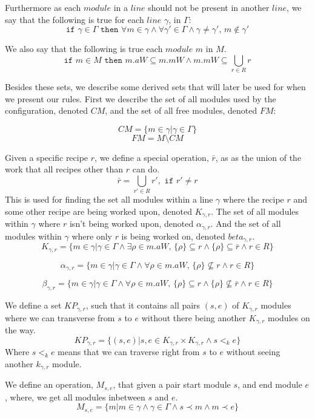 Furthermore as each $module$ in a $line$ should not be present in another $line$, we say that the following is true for each $line$ $\gamma$, in $\Gamma$:
\[\texttt{if } \gamma \in \Gamma \texttt{ then } \forall m \in \gamma \land \forall \gamma ' \in \Gamma \land \gamma \neq \gamma ',\, m \notin \gamma ' \]

We also say that the following is true each $module$ $m$ in $M$.
\[\texttt{if } m \in M \texttt{ then } m.aW \subseteq m.mW \land m.mW \subseteq  \bigcup_{r\in R}r\] 


Besides these sets, we describe some derived sets that will later be used for when we present our rules. First we describe the set of all modules used by the configuration, denoted $CM$, and the set of all free modules, denoted $FM$:


\[CM = \{m \in \gamma | \gamma \in \Gamma \}\]
\[FM = M \setminus CM \]

Given a specific recipe $r$, we define a special operation, $\bar{r}$, as as the union of the work that all recipes other than $r$ can do. 
\[\bar{r} = \bigcup_{r' \in R}r', \texttt{ if } r' \neq r\]
This is used for finding the set all modules within a line $\gamma$ where the recipe $r$ and some other recipe are being worked upon, denoted $K_{\gamma ,r}$. The set of all modules within $\gamma$ where $r$ isn't being worked upon, denoted $\alpha_{\gamma ,r}$. And the set of all modules within $\gamma$ where only $r$ is being worked on, denoted $beta_{\gamma ,r}$. 
\[K_{\gamma ,r} = \{m \in \gamma | \gamma \in \Gamma \land \exists \rho \in m.aW,\, \{\rho\} \subseteq r \land \{\rho\} \subseteq \bar{r} \land r \in R\}\]

\[\alpha_{\gamma ,r}  = \{m \in \gamma | \gamma \in \Gamma \land \forall \rho \in m.aW,\, \{\rho\} \nsubseteq r \land r \in R\}\]

\[\beta_{\gamma ,r}  = \{m \in \gamma | \gamma \in \Gamma \land \forall \rho \in m.aW,\, \{\rho\} \subseteq r \land \{\rho\} \nsubseteq \bar{r} \land r \in R\}\]


We define a set $KP_{\gamma ,r}$, such that it contains all pairs $(s, e)$ of $K_{\gamma ,r}$ modules where we can transverse from $s$ to $e$ without there being another $K_{\gamma, r}$ modules on the way.
\[KP_{\gamma ,r} = \{(s, e)| {s, e} \in K_{\gamma ,r} \times K_{\gamma ,r} \land s <_k  e\}\]
Where $s <_k e$ means that we can traverse right from $s$ to $e$ without seeing another $k_{\gamma, r}$ module. 

We define an operation, $M_{s,e}$, that given a pair start module $s$, and end module  $e$, where, we get all modules inbetween $s$ and $e$.
\[M_{s,e} = \{m | m \in \gamma \land \gamma \in \Gamma \land s \prec m \land m \prec e\}\]

